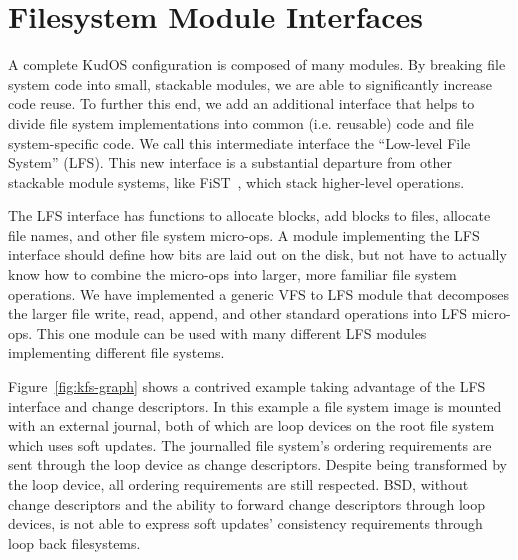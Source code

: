 \preparagraphspacing{}
\section*{Filesystem Module Interfaces}
\label{sec:interfaces}

A complete KudOS configuration is composed of many modules.
By breaking file system code into
small, stackable modules, we are able to significantly increase code reuse. To
further this end, we add an additional interface that helps to divide file system
implementations into common (i.e. reusable) code and file system-specific code.
We call this intermediate interface the ``Low-level File System'' (LFS). This
new interface is a substantial departure from other stackable module systems,
like FiST~\cite{zadok00fist}, which stack higher-level operations.

The LFS interface has functions to allocate blocks, add blocks to
files, allocate file names, and other file system micro-ops. A module
implementing the LFS interface should define how bits are laid out on
the disk, but not have to actually know how to combine the micro-ops
into larger, more familiar file system operations. We have implemented
a generic VFS to LFS module that decomposes the larger file write,
read, append, and other standard operations into LFS micro-ops. This
one module can be used with many different LFS modules implementing
different file systems.

Figure~\ref{fig:kfs-graph} shows a contrived example taking advantage of the LFS
interface and change descriptors. In this example a file system image is mounted
with an external journal, both of which are loop devices on the root file system
which uses soft updates. The journalled file system's ordering requirements are
sent through the loop device as change descriptors. Despite being transformed
by the loop device, all ordering requirements are still respected.
%
BSD, without change descriptors and the ability to forward change
descriptors through loop devices, is not able to express soft updates'
consistency requirements through loop back filesystems.
